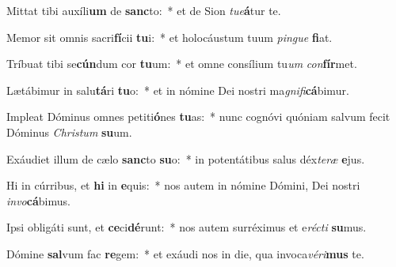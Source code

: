 \item Mittat tibi auxíli\textbf{um} de \textbf{sanc}to:~* et de Sion \textit{tu}\textit{e}\textbf{á}tur te.
\item Memor sit omnis sacri\textbf{fí}cii \textbf{tu}i:~* et holocáustum tuum \textit{pin}\textit{gue} \textbf{fi}at.
\item Tríbuat tibi se\textbf{cún}dum cor \textbf{tu}um:~* et omne consílium tu\textit{um} \textit{con}\textbf{fír}met.
\item Lætábimur in salu\textbf{tá}ri \textbf{tu}o:~* et in nómine Dei nostri ma\textit{gni}\textit{fi}\textbf{cá}bimur.
\item Impleat Dóminus omnes petiti\textbf{ó}nes \textbf{tu}as:~* nunc cognóvi quóniam salvum fecit Dóminus \textit{Chris}\textit{tum} \textbf{su}um.
\item Exáudiet illum de cælo \textbf{sanc}to \textbf{su}o:~* in potentátibus salus déx\textit{te}\textit{ræ} \textbf{e}jus.
\item Hi in cúrribus, et \textbf{hi} in \textbf{e}quis:~* nos autem in nómine Dómini, Dei nostri \textit{in}\textit{vo}\textbf{cá}bimus.
\item Ipsi obligáti sunt, et \textbf{ce}ci\textbf{dé}runt:~* nos autem surréximus et e\textit{réc}\textit{ti} \textbf{su}mus.
\item Dómine \textbf{sal}vum fac \textbf{re}gem:~* et exáudi nos in die, qua invoca\textit{vé}\textit{ri}\textbf{mus} te.
